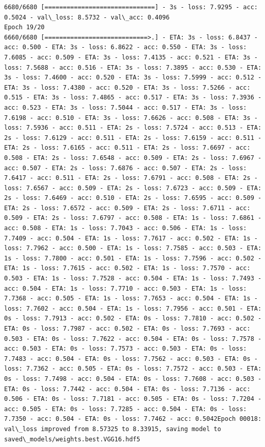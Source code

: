 \documentclass[11pt]{article}
\begin{document}
\begin{Verbatim}[commandchars=\\\{\}]
6680/6680 [==============================] - 3s - loss: 7.9295 - acc: 0.5024 - val\_loss: 8.5732 - val\_acc: 0.4096
Epoch 19/20
6660/6680 [============================>.] - ETA: 3s - loss: 6.8437 - acc: 0.500 - ETA: 3s - loss: 6.8622 - acc: 0.550 - ETA: 3s - loss: 7.6085 - acc: 0.509 - ETA: 3s - loss: 7.4135 - acc: 0.521 - ETA: 3s - loss: 7.5688 - acc: 0.516 - ETA: 3s - loss: 7.3895 - acc: 0.530 - ETA: 3s - loss: 7.4600 - acc: 0.520 - ETA: 3s - loss: 7.5999 - acc: 0.512 - ETA: 3s - loss: 7.4380 - acc: 0.520 - ETA: 3s - loss: 7.5266 - acc: 0.515 - ETA: 3s - loss: 7.4865 - acc: 0.517 - ETA: 3s - loss: 7.3936 - acc: 0.523 - ETA: 3s - loss: 7.5044 - acc: 0.517 - ETA: 3s - loss: 7.6198 - acc: 0.510 - ETA: 3s - loss: 7.6626 - acc: 0.508 - ETA: 3s - loss: 7.5936 - acc: 0.511 - ETA: 2s - loss: 7.5724 - acc: 0.513 - ETA: 2s - loss: 7.6129 - acc: 0.511 - ETA: 2s - loss: 7.6159 - acc: 0.511 - ETA: 2s - loss: 7.6165 - acc: 0.511 - ETA: 2s - loss: 7.6697 - acc: 0.508 - ETA: 2s - loss: 7.6548 - acc: 0.509 - ETA: 2s - loss: 7.6967 - acc: 0.507 - ETA: 2s - loss: 7.6876 - acc: 0.507 - ETA: 2s - loss: 7.6417 - acc: 0.511 - ETA: 2s - loss: 7.6791 - acc: 0.508 - ETA: 2s - loss: 7.6567 - acc: 0.509 - ETA: 2s - loss: 7.6723 - acc: 0.509 - ETA: 2s - loss: 7.6469 - acc: 0.510 - ETA: 2s - loss: 7.6595 - acc: 0.509 - ETA: 2s - loss: 7.6572 - acc: 0.509 - ETA: 2s - loss: 7.6711 - acc: 0.509 - ETA: 2s - loss: 7.6797 - acc: 0.508 - ETA: 1s - loss: 7.6861 - acc: 0.508 - ETA: 1s - loss: 7.7043 - acc: 0.506 - ETA: 1s - loss: 7.7409 - acc: 0.504 - ETA: 1s - loss: 7.7617 - acc: 0.502 - ETA: 1s - loss: 7.7962 - acc: 0.500 - ETA: 1s - loss: 7.7585 - acc: 0.503 - ETA: 1s - loss: 7.7800 - acc: 0.501 - ETA: 1s - loss: 7.7596 - acc: 0.502 - ETA: 1s - loss: 7.7615 - acc: 0.502 - ETA: 1s - loss: 7.7570 - acc: 0.503 - ETA: 1s - loss: 7.7528 - acc: 0.504 - ETA: 1s - loss: 7.7493 - acc: 0.504 - ETA: 1s - loss: 7.7710 - acc: 0.503 - ETA: 1s - loss: 7.7368 - acc: 0.505 - ETA: 1s - loss: 7.7653 - acc: 0.504 - ETA: 1s - loss: 7.7602 - acc: 0.504 - ETA: 1s - loss: 7.7956 - acc: 0.501 - ETA: 0s - loss: 7.7913 - acc: 0.502 - ETA: 0s - loss: 7.7810 - acc: 0.502 - ETA: 0s - loss: 7.7987 - acc: 0.502 - ETA: 0s - loss: 7.7693 - acc: 0.503 - ETA: 0s - loss: 7.7622 - acc: 0.504 - ETA: 0s - loss: 7.7578 - acc: 0.503 - ETA: 0s - loss: 7.7573 - acc: 0.503 - ETA: 0s - loss: 7.7483 - acc: 0.504 - ETA: 0s - loss: 7.7562 - acc: 0.503 - ETA: 0s - loss: 7.7362 - acc: 0.505 - ETA: 0s - loss: 7.7572 - acc: 0.503 - ETA: 0s - loss: 7.7498 - acc: 0.504 - ETA: 0s - loss: 7.7608 - acc: 0.503 - ETA: 0s - loss: 7.7442 - acc: 0.504 - ETA: 0s - loss: 7.7136 - acc: 0.506 - ETA: 0s - loss: 7.7181 - acc: 0.505 - ETA: 0s - loss: 7.7204 - acc: 0.505 - ETA: 0s - loss: 7.7285 - acc: 0.504 - ETA: 0s - loss: 7.7350 - acc: 0.504 - ETA: 0s - loss: 7.7462 - acc: 0.5042Epoch 00018: val\_loss improved from 8.57325 to 8.33915, saving model to saved\_models/weights.best.VGG16.hdf5

\end{Verbatim}
\end{document}
